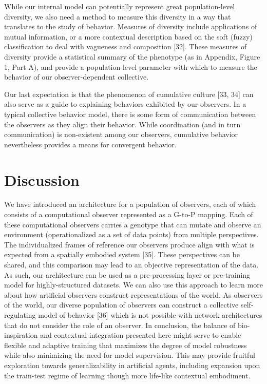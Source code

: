 \documentclass{article}
\begin{document}
While our internal model can potentially represent great population-level diversity, we also need a method to measure this diversity in a way that translates to the study of behavior. Measures of diversity include applications of mutual information, or a more contextual description based on the soft (fuzzy) classification to deal with vagueness and composition [32]. These measures of diversity provide a statistical summary of the phenotype (as in Appendix, Figure 1, Part A), and provide a population-level parameter with which to measure the behavior of our observer-dependent collective.

Our last expectation is that the phenomenon of cumulative culture [33, 34] can also serve as a guide to explaining behaviors exhibited by our observers. In a typical collective behavior model, there is some form of communication between the observers as they align their behavior. While coordination (and in turn communication) is non-existent among our observers, cumulative behavior nevertheless provides a means for convergent behavior.

\section{Discussion}
We have introduced an architecture for a population of observers, each of which consists of a computational observer represented as a G-to-P mapping. Each of these computational observers carries a genotype that can mutate and observe an environment (operationalized as a set of data points) from multiple perspectives. The individualized frames of reference our observers produce align with what is expected from a spatially embodied system [35]. These perspectives can be shared, and this comparison may lead to an objective representation of the data. As such, our architecture can be used as a pre-processing layer or pre-training model for highly-structured datasets. We can also use this approach to learn more about how artificial observers construct representations of the world. As observers of the world, our diverse population of observers can construct a collective self-regulating model of behavior [36] which is not possible with network architectures that do not consider the role of an observer. In conclusion, the balance of bio-inspiration and contextual integration presented here might serve to enable flexible and adaptive training that maximizes the degree of model robustness while also minimizing the need for model supervision. This may provide fruitful exploration towards generalizability in artificial agents, including expansion upon the train-test regime of learning though more life-like contextual embodiment.
\end{document}
